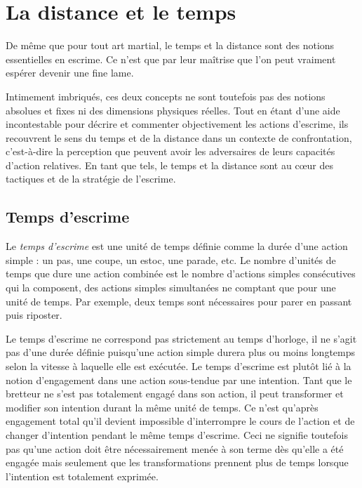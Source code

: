 \chapter{La distance et le temps}\label{ch:distancetemps}

De même que pour tout art martial, le temps et la distance sont des notions essentielles en escrime.
Ce n'est que par leur maîtrise que l'on peut vraiment espérer devenir une fine lame.

Intimement imbriqués, ces deux concepts ne sont toutefois pas des notions absolues et fixes ni des dimensions physiques réelles.
Tout en étant d'une aide incontestable pour décrire et commenter objectivement les actions d'escrime, ils recouvrent le sens du temps et de la distance dans un contexte de confrontation, c'est-à-dire la perception que peuvent avoir les adversaires de leurs capacités d'action relatives.
En tant que tels, le temps et la distance sont au c\oe{}ur des tactiques et de la stratégie de l'escrime.

\section{Temps d'escrime} 
Le \emph{temps d'escrime} est une unité de temps définie comme la durée d'une action simple : un pas, une coupe, un estoc, une parade, etc. 
Le nombre d'unités de temps que dure une action combinée est le nombre d'actions simples consécutives qui la composent, des actions simples simultanées ne comptant que pour une unité de temps.
Par exemple, deux temps sont nécessaires pour parer en passant puis riposter.

Le temps d'escrime ne correspond pas strictement au temps d'horloge, il ne s'agit pas d'une durée définie puisqu'une action simple durera plus ou moins longtemps selon la vitesse à laquelle elle est exécutée.
Le temps d'escrime est plutôt lié à la notion d'engagement dans une action sous-tendue par une intention.  
Tant que le bretteur ne s'est pas totalement engagé dans son action, il peut transformer  et modifier son intention durant la même unité de temps.
Ce n'est qu'après engagement total qu'il devient impossible d'interrompre le cours de l'action et de changer d'intention pendant le même temps d'escrime.
Ceci ne signifie toutefois pas qu'une action doit être nécessairement menée à son terme dès qu'elle a été engagée mais seulement que les transformations prennent plus de temps lorsque l'intention est totalement exprimée.

